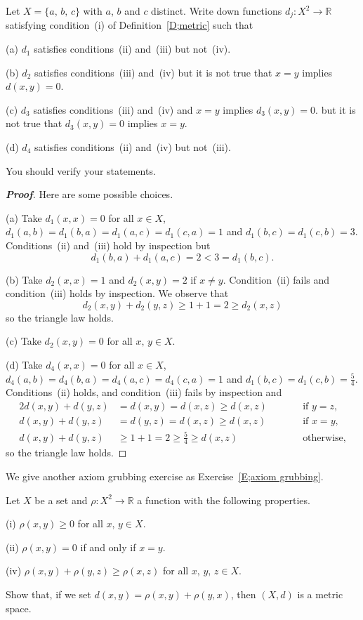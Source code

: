 \begin{theorem}\label{P;not metric}
Let $X=\{a,\,b,\,c\}$ with $a$, $b$ and $c$
distinct. Write down functions $d_{j}:X^{2}\rightarrow{\mathbb R}$ 
satisfying condition~(i) of Definition~\ref{D;metric}
such that

(a) $d_{1}$ satisfies conditions~(ii) and~(iii) but not~(iv).

(b) $d_{2}$ satisfies conditions~(iii) and~(iv) but it is not
true that $x=y$ implies $d(x,y)=0$.

(c) $d_{3}$ satisfies conditions~(iii) and~(iv)
and $x=y$ implies $d_{3}(x,y)=0$.
but it is not
true that  $d_{3}(x,y)=0$ implies $x=y$.

(d) $d_{4}$ satisfies conditions~(ii) and~(iv) but not~(iii).

You should verify your statements.
\end{theorem}
\begin{proof}[\bf Proof] Here are some possible choices.

(a) Take $d_{1}(x,x)=0$ for all $x\in X$,
$d_{1}(a,b)=d_{1}(b,a)=d_{1}(a,c)=d_{1}(c,a)=1$
and $d_{1}(b,c)=d_{1}(c,b)=3$. Conditions~(ii) and~(iii)
hold by inspection but
\[d_{1}(b,a)+d_{1}(a,c)=2<3=d_{1}(b,c).\]

(b) Take $d_{2}(x,x)=1$
and $d_{2}(x,y)=2$ if $x\neq y$. Condition~(ii) fails
and condition~(iii) holds by inspection. We observe that
\[d_{2}(x,y)+d_{2}(y,z)\geq 1+1=2\geq d_{2}(x,z)\]
so the triangle law holds.

(c) Take
$d_{2}(x,y)=0$ for all $x,\,y\in X$.

(d) Take $d_{4}(x,x)=0$ for all $x\in X$, $d_{4}(a,b)=d_{4}(b,a)=d_{4}(a,c)=d_{4}(c,a)=1$ and $d_{1}(b,c)=d_{1}(c,b)=\tfrac{5}{4}$. Conditions~(ii) holds,
and condition~(iii) fails by inspection and
\begin{alignat*}{2}
d(x,y)+d(y,z)&=d(x,y)=d(x,z)\geq d(x,z)&&\qquad\text{if $y=z$},\\
d(x,y)+d(y,z)&=d(y,z)=d(x,z)\geq d(x,z)&&\qquad\text{if $x=y$},\\
d(x,y)+d(y,z)&\geq 
1+1=2\geq\tfrac{5}{4}\geq d(x,z)&&\qquad\text{otherwise,}
\end{alignat*}
so the triangle law holds.
\end{proof}

We give another axiom grubbing exercise as Exercise~\ref{E;axiom grubbing}.
\begin{exercise} Let $X$ be a set and
$\rho:X^{2}\rightarrow{\mathbb R}$ a function with the
following properties.

(i) $\rho(x,y)\geq 0$ for all $x,\,y\in X$.
                                                                               
(ii) $\rho(x,y)=0$ if and only if $x=y$.
                                                                               
(iv) $\rho(x,y)+\rho(y,z)\geq \rho(x,z)$ for all $x,\,y,\,z\in X$.
    
\noindent Show that, if we set $d(x,y)=\rho(x,y)+\rho(y,x)$,
then $(X,d)$ is a metric space.
\end{exercise}

